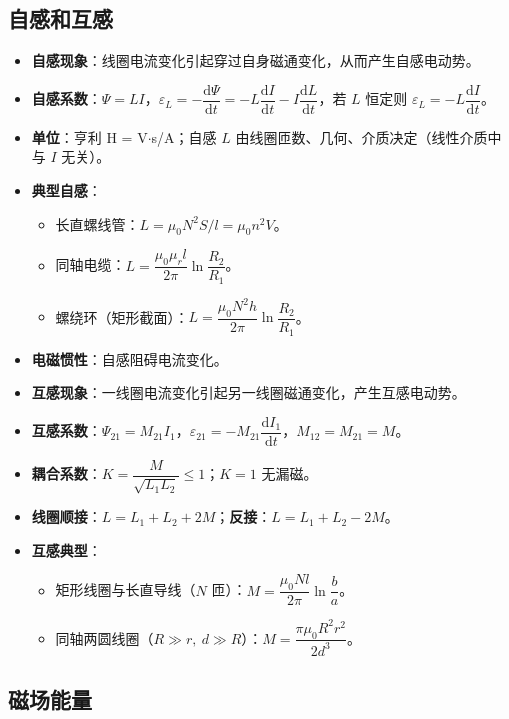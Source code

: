 \documentclass[12pt,a4paper]{ctexart}
\begin{document}
\subsection{自感和互感}

\begin{itemize}
    \item \textbf{自感现象}：线圈电流变化引起穿过自身磁通变化，从而产生自感电动势。
    \item \textbf{自感系数}：$\Psi=LI$，$\varepsilon_L=-\dfrac{\mathrm d\Psi}{\mathrm dt}=-L\dfrac{\mathrm dI}{\mathrm dt}-I\dfrac{\mathrm dL}{\mathrm dt}$，若 $L$ 恒定则 $\varepsilon_L=-L\dfrac{\mathrm dI}{\mathrm dt}$。
    \item \textbf{单位}：亨利 H = V$\cdot$s/A；自感 $L$ 由线圈匝数、几何、介质决定（线性介质中与 $I$ 无关）。
    \item \textbf{典型自感}：
    \begin{itemize}
        \item 长直螺线管：$L=\mu_0 N^2 S/l=\mu_0 n^2 V$。
        \item 同轴电缆：$L=\dfrac{\mu_0\mu_r l}{2\pi}\ln\dfrac{R_2}{R_1}$。
        \item 螺绕环（矩形截面）：$L=\dfrac{\mu_0 N^2 h}{2\pi}\ln\dfrac{R_2}{R_1}$。
    \end{itemize}
    \item \textbf{电磁惯性}：自感阻碍电流变化。
    \item \textbf{互感现象}：一线圈电流变化引起另一线圈磁通变化，产生互感电动势。
    \item \textbf{互感系数}：$\Psi_{21}=M_{21}I_1$，$\varepsilon_{21}=-M_{21}\dfrac{\mathrm dI_1}{\mathrm dt}$，$M_{12}=M_{21}=M$。
    \item \textbf{耦合系数}：$K=\dfrac{M}{\sqrt{L_1L_2}}\le 1$；$K=1$ 无漏磁。
    \item \textbf{线圈顺接}：$L=L_1+L_2+2M$；\textbf{反接}：$L=L_1+L_2-2M$。
    \item \textbf{互感典型}：
    \begin{itemize}
        \item 矩形线圈与长直导线（$N$ 匝）：$M=\dfrac{\mu_0 Nl}{2\pi}\ln\dfrac{b}{a}$。
        \item 同轴两圆线圈（$R\gg r,\ d\gg R$）：$M=\dfrac{\pi\mu_0 R^2 r^2}{2d^3}$。
    \end{itemize}
\end{itemize}

\subsection{磁场能量}
\end{document}
